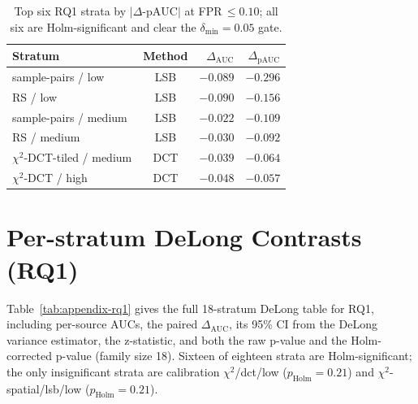 \documentclass[10pt,twocolumn,a4paper]{article}
\begin{document}
\begin{table}[!htbp]
\centering\small
\caption{Top six RQ1 strata by $|\Delta\text{-pAUC}|$ at FPR\,$\leq\!0.10$; all six are Holm-significant and clear the $\delta_\text{min}\!=\!0.05$ gate.}
\label{tab:pauc-top}
\setlength{\tabcolsep}{5pt}\renewcommand{\arraystretch}{1.1}
\begin{tabular}{@{}l c r r@{}}
\toprule
\textbf{Stratum} & \textbf{Method} & \textbf{$\Delta_\text{AUC}$} & \textbf{$\Delta_\text{pAUC}$} \\
\midrule
sample-pairs / low    & LSB & $-0.089$ & $\boldsymbol{-0.296}$ \\
RS / low              & LSB & $-0.090$ & $-0.156$ \\
sample-pairs / medium & LSB & $-0.022$ & $-0.109$ \\
RS / medium           & LSB & $-0.030$ & $-0.092$ \\
$\chi^2$-DCT-tiled / medium & DCT & $-0.039$ & $-0.064$ \\
$\chi^2$-DCT / high   & DCT & $-0.048$ & $-0.057$ \\
\bottomrule
\end{tabular}
\end{table}

\section{Per-stratum DeLong Contrasts (RQ1)}
\label{app:rq1-delong}
Table~\ref{tab:appendix-rq1} gives the full 18-stratum DeLong table for RQ1, including per-source AUCs, the paired $\Delta_\text{AUC}$, its 95\% CI from the DeLong variance estimator, the z-statistic, and both the raw p-value and the Holm-corrected p-value (family size 18). Sixteen of eighteen strata are Holm-significant; the only insignificant strata are calibration $\chi^2$/dct/low ($p_\text{Holm}\!=\!0.21$) and $\chi^2$-spatial/lsb/low ($p_\text{Holm}\!=\!0.21$).
\end{document}
